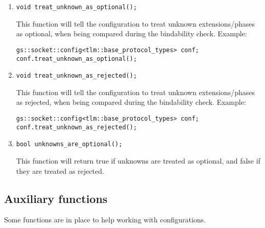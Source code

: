 \documentclass[a4paper,10pt]{article}          %
\begin{document}
\begin{enumerate}
\item 
\verb|void treat_unknown_as_optional();|

This function will tell the configuration to treat unknown extensions/phases as optional, when being compared during the bindability check. Example:

\begin{small}
\begin{verbatim}
gs::socket::config<tlm::base_protocol_types> conf;
conf.treat_unknown_as_optional();
\end{verbatim}
\end{small}

\item 
\verb|void treat_unknown_as_rejected();|

This function will tell the configuration to treat unknown extensions/phases as rejected, when being compared during the bindability check. Example:

\begin{small}
\begin{verbatim}
gs::socket::config<tlm::base_protocol_types> conf;
conf.treat_unknown_as_rejected();
\end{verbatim}
\end{small}

\item 
\verb|bool unknowns_are_optional();|

This function will return true if unknowns are treated as optional, and false if they are treated as rejected.

\end{enumerate}

\subsection{Auxiliary functions}
Some functions are in place to help working with configurations.
\end{document}
